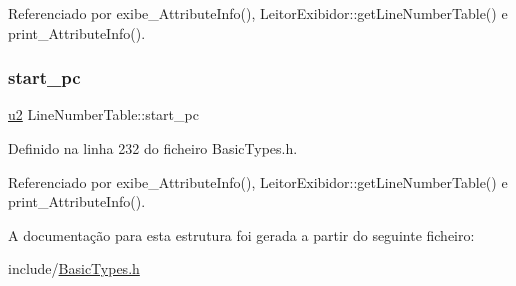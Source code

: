 Referenciado por exibe\+\_\+\+Attribute\+Info(), Leitor\+Exibidor\+::get\+Line\+Number\+Table() e print\+\_\+\+Attribute\+Info().

\mbox{\label{structLineNumberTable_a16496fea3c8c74d3a54f0104061f0df9}} 
\subsubsection{\texorpdfstring{start\+\_\+pc}{start\_pc}}
{\footnotesize\ttfamily \hyperlink{BasicTypes_8h_a732cde1300aafb73b0ea6c2558a7a54f}{u2} Line\+Number\+Table\+::start\+\_\+pc}



Definido na linha 232 do ficheiro Basic\+Types.\+h.



Referenciado por exibe\+\_\+\+Attribute\+Info(), Leitor\+Exibidor\+::get\+Line\+Number\+Table() e print\+\_\+\+Attribute\+Info().



A documentação para esta estrutura foi gerada a partir do seguinte ficheiro\+:\begin{DoxyCompactItemize}
\item 
include/\hyperlink{BasicTypes_8h}{Basic\+Types.\+h}\end{DoxyCompactItemize}
